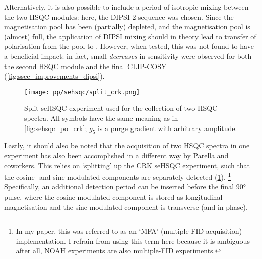 Alternatively, it is also possible to include a period of isotropic mixing between the two HSQC modules: here, the DIPSI-2 sequence\autocite{Shaka1988JMR} was chosen.
Since the  magnetisation pool has been (partially) depleted, and the  magnetisation pool is (almost) full, the application of DIPSI mixing should in theory lead to transfer of polarisation from the  pool to .
However, when tested, this was not found to have a beneficial impact: in fact, small \textit{decreases} in sensitivity were observed for both the second HSQC module and the final CLIP-COSY (\cref{fig:sscc_improvements_dipsi}).

\begin{figure}[!ht]
    \centering
    \texttt{[image: pp/sehsqc/split\_crk.png]}%
    \caption[Split-seHSQC experiment]{
        Split-seHSQC experiment used for the collection of two HSQC spectra.\autocite{Nolis2019CPC}
        All symbols have the same meaning as in \cref{fig:sehsqc_po_crk}; $g_5$ is a purge gradient with arbitrary amplitude.
    }
    \label{fig:split_crk}
\end{figure}

Lastly, it should also be noted that the acquisition of two HSQC spectra in one experiment has also been accomplished in a different way by Parella and coworkers\autocite{Nolis2019CPC,Nolis2019JMR}.
This relies on `splitting' up the CRK seHSQC experiment, such that the cosine- and sine-modulated components are separately detected (\cref{fig:split_crk}).%
\footnote{In my paper\autocite{Yong2021JMR}, this was referred to as an `MFA' (multiple-FID acquisition) implementation. I refrain from using this term here because it is ambiguous---after all, NOAH experiments are also multiple-FID experiments.}
Specifically, an additional detection period can be inserted before the final \proton{} \ang{90} pulse, where the cosine-modulated component is stored as longitudinal magnetisation and the sine-modulated component is transverse (and in-phase).

